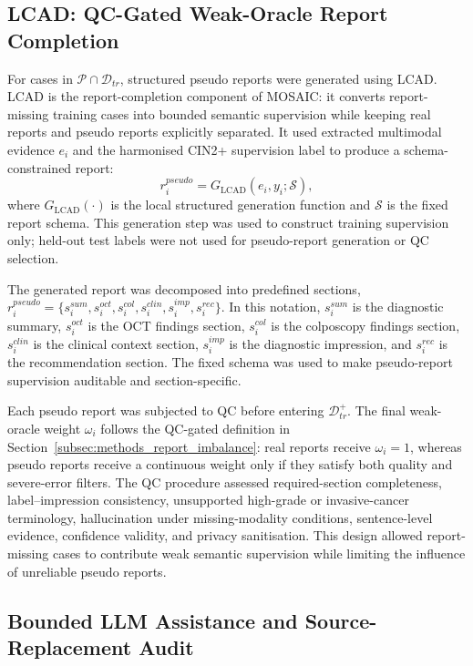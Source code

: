 \documentclass[11pt, a4paper]{article}
\theoremstyle{plain}
\theoremstyle{definition}
\begin{document}
\subsection{LCAD: QC-Gated Weak-Oracle Report Completion}
\label{subsec:methods_lcad}

For cases in \(\mathcal{P}\cap\mathcal{D}_{tr}\), structured pseudo reports were generated using LCAD. LCAD is the report-completion component of MOSAIC: it converts report-missing training cases into bounded semantic supervision while keeping real reports and pseudo reports explicitly separated. It used extracted multimodal evidence \(e_i\) and the harmonised CIN2+ supervision label to produce a schema-constrained report:
\begin{equation}
r_i^{pseudo}=G_{\mathrm{LCAD}}(e_i,y_i;\mathcal{S}),
\end{equation}
where \(G_{\mathrm{LCAD}}(\cdot)\) is the local structured generation function and \(\mathcal{S}\) is the fixed report schema. This generation step was used to construct training supervision only; held-out test labels were not used for pseudo-report generation or QC selection.

The generated report was decomposed into predefined sections, \(r_i^{pseudo}=\{s_i^{sum},s_i^{oct},s_i^{col},s_i^{clin},s_i^{imp},s_i^{rec}\}\). In this notation, \(s_i^{sum}\) is the diagnostic summary, \(s_i^{oct}\) is the OCT findings section, \(s_i^{col}\) is the colposcopy findings section, \(s_i^{clin}\) is the clinical context section, \(s_i^{imp}\) is the diagnostic impression, and \(s_i^{rec}\) is the recommendation section. The fixed schema was used to make pseudo-report supervision auditable and section-specific.

Each pseudo report was subjected to QC before entering \(\mathcal{D}_{tr}^{+}\). The final weak-oracle weight \(\omega_i\) follows the QC-gated definition in Section~\ref{subsec:methods_report_imbalance}: real reports receive \(\omega_i=1\), whereas pseudo reports receive a continuous weight only if they satisfy both quality and severe-error filters. The QC procedure assessed required-section completeness, label--impression consistency, unsupported high-grade or invasive-cancer terminology, hallucination under missing-modality conditions, sentence-level evidence, confidence validity, and privacy sanitisation. This design allowed report-missing cases to contribute weak semantic supervision while limiting the influence of unreliable pseudo reports.

\subsection{Bounded LLM Assistance and Source-Replacement Audit}
\label{subsec:methods_provider}
\end{document}
